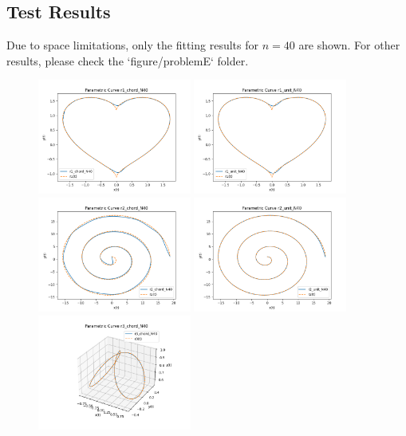 \documentclass[a4paper]{article}
\begin{document}
\subsection{Test Results}
Due to space limitations, only the fitting results for \( n = 40 \) are shown. For other results, please check the `figure/problemE` folder.
\begin{figure}[H]
    \centering
    \includegraphics[width=0.45\textwidth]{./figure/problemE/r1_chord_N40.png}
    \includegraphics[width=0.45\textwidth]{./figure/problemE/r1_unit_N40.png}
    \includegraphics[width=0.45\textwidth]{./figure/problemE/r2_chord_N40.png}
    \includegraphics[width=0.45\textwidth]{./figure/problemE/r2_unit_N40.png}
    \includegraphics[width=0.45\textwidth]{./figure/problemE/r3_chord_N40.png}

\end{figure}
\end{document}
